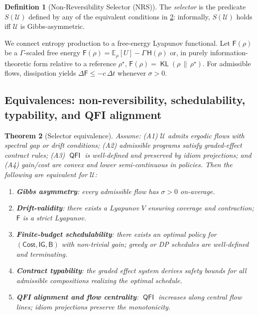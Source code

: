 \documentclass[11pt]{article}
\theoremstyle{plain}
\newtheorem{theorem}{Theorem}[section]
\theoremstyle{definition}
\newtheorem{definition}[theorem]{Definition}
\theoremstyle{remark}
\DeclareMathOperator{\KL}{\mathsf{KL}}
\DeclareMathOperator{\QFI}{\mathsf{QFI}}
\newcommand{\EE}{\mathbb{E}}
\newcommand{\1}{\mathds{1}}
\newcommand{\U}{\mathcal{U}}
\newcommand{\Budget}{\mathsf{B}}
\newcommand{\Cost}{\mathsf{Cost}}
\newcommand{\Gain}{\mathsf{IG}}
\newcommand{\Free}{\mathsf{F}}
\newcommand{\EP}{\sigma} %
\newcommand{\dH}{\mathsf{H}} %
\begin{document}
\begin{definition}[Non-Reversibility Selector (NRS)]
The \emph{selector} is the predicate $S(\U)$ defined by any of the equivalent conditions in \cref{thm:equivalence}: informally, $S(\U)$ holds iff $\U$ is Gibbs-asymmetric.
\end{definition}

We connect entropy production to a free-energy Lyapunov functional.
Let $\Free(\rho)$ be a $\Gamma$-scaled free energy $\Free(\rho)=\EE_\rho[U]-\Gamma\,\dH(\rho)$ or, in purely information-theoretic form relative to a reference $\rho^\star$, $\Free(\rho)=\KL(\rho\,\|\,\rho^\star)$.
For admissible flows, dissipation yields $\Delta\Free\le -c\,\Delta t$ whenever $\EP>0$.

\subsection{Equivalences: non-reversibility, schedulability, typability, and QFI alignment}
\begin{theorem}[Selector equivalence]
\label{thm:equivalence}
Assume: (A1) $\U$ admits ergodic flows with spectral gap or drift conditions; (A2) admissible programs satisfy graded-effect contract rules; (A3) $\QFI$ is well-defined and preserved by idiom projections; and (A4) gain/cost are convex and lower semi-continuous in policies.
Then the following are equivalent for $\U$:
\begin{enumerate}[label=(E\arabic*)]
\item \label{eq:e1} \textbf{Gibbs asymmetry}: every admissible flow has $\EP>0$ on-average.
\item \label{eq:e2} \textbf{Drift-validity}: there exists a Lyapunov $V$ ensuring coverage and contraction; $\Free$ is a strict Lyapunov.
\item \label{eq:e3} \textbf{Finite-budget schedulability}: there exists an optimal policy for $(\Cost,\Gain,\Budget)$ with non-trivial gain; greedy or DP schedules are well-defined and terminating.
\item \label{eq:e4} \textbf{Contract typability}: the graded effect system derives safety bounds for all admissible compositions realizing the optimal schedule.
\item \label{eq:e5} \textbf{QFI alignment and flow centrality}: $\QFI$ increases along central flow lines; idiom projections preserve the monotonicity.
\end{enumerate}
\end{theorem}
\end{document}
